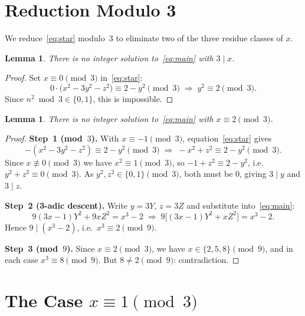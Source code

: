 \documentclass[12pt, a4paper]{amsart}
\theoremstyle{plain}
\newtheorem{lemma}[theorem]{Lemma}
\theoremstyle{definition}
\begin{document}
\section{Reduction Modulo 3}

We reduce~\eqref{eq:star} modulo~$3$ to eliminate two of the three residue
classes of $x$.

\begin{lemma}\label{lem:mod3x0}
  There is no integer solution to~\eqref{eq:main} with $3 \mid x$.
\end{lemma}

\begin{proof}
  Set $x \equiv 0 \pmod{3}$ in~\eqref{eq:star}:
  \[
    0 \cdot \bigl(x^2 - 3y^2 - z^2\bigr) \equiv 2 - y^2 \pmod{3}
    \;\Longrightarrow\;
    y^2 \equiv 2 \pmod{3}.
  \]
  Since $n^2 \bmod 3 \in \{0,1\}$, this is impossible.
\end{proof}

\begin{lemma}\label{lem:mod3x2}
  There is no integer solution to~\eqref{eq:main} with $x \equiv 2 \pmod{3}$.
\end{lemma}

\begin{proof}
  \textbf{Step~1 (mod~$3$).}
  With $x \equiv -1 \pmod{3}$, equation~\eqref{eq:star} gives
  \[
    -(x^2 - 3y^2 - z^2) \equiv 2 - y^2 \pmod{3}
    \;\Longrightarrow\;
    -x^2 + z^2 \equiv 2 - y^2 \pmod{3}.
  \]
  Since $x \not\equiv 0 \pmod{3}$ we have $x^2 \equiv 1 \pmod{3}$, so
  $-1 + z^2 \equiv 2 - y^2$, i.e.\ $y^2 + z^2 \equiv 0 \pmod{3}$.
  As $y^2, z^2 \in \{0,1\} \pmod{3}$, both must be $0$, giving $3 \mid y$
  and $3 \mid z$.

  \textbf{Step~2 (3-adic descent).}
  Write $y = 3Y$, $z = 3Z$ and substitute into~\eqref{eq:main}:
  \[
    9(3x-1)Y^2 + 9xZ^2 = x^3 - 2
    \;\Longrightarrow\;
    9\bigl[(3x-1)Y^2 + xZ^2\bigr] = x^3 - 2.
  \]
  Hence $9 \mid (x^3 - 2)$, i.e.\ $x^3 \equiv 2 \pmod{9}$.

  \textbf{Step~3 (mod~$9$).}
  Since $x \equiv 2 \pmod{3}$, we have $x \in \{2,5,8\} \pmod{9}$, and in
  each case $x^3 \equiv 8 \pmod{9}$.  But $8 \neq 2 \pmod{9}$: contradiction.
\end{proof}

\section{The Case \texorpdfstring{$x \equiv 1 \pmod{3}$}{x ≡ 1 (mod 3)}}
\label{sec:case1}
\end{document}
